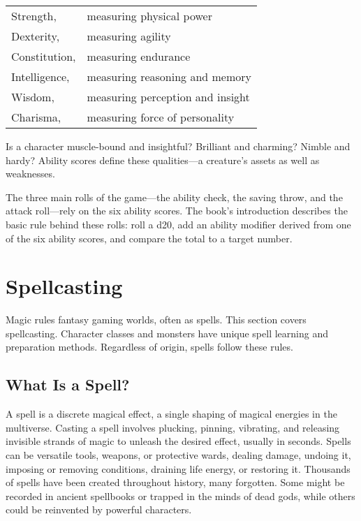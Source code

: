 \begin{longtable}[]{@{}
  >{\raggedright\arraybackslash}p{}
  >{\raggedright\arraybackslash}p{}@{}}
\toprule\noalign{}
\endhead
\bottomrule\noalign{}
\endlastfoot
Strength, & measuring physical power \\
Dexterity, & measuring agility \\
Constitution, & measuring endurance \\
Intelligence, & measuring reasoning and memory \\
Wisdom, & measuring perception and insight \\
Charisma, & measuring force of personality \\
\end{longtable}

Is a character muscle-bound and insightful? Brilliant and charming?
Nimble and hardy? Ability scores define these qualities---a creature's
assets as well as weaknesses.

The three main rolls of the game---the ability check, the saving throw,
and the attack roll---rely on the six ability scores. The book's
introduction describes the basic rule behind these rolls: roll a d20,
add an ability modifier derived from one of the six ability scores, and
compare the total to a target number.

\section{Spellcasting}\label{spellcasting}

Magic rules fantasy gaming worlds, often as spells. This section covers
spellcasting. Character classes and monsters have unique spell learning
and preparation methods. Regardless of origin, spells follow these
rules.

\subsection{What Is a Spell?}\label{_what_is_a_spell}

A spell is a discrete magical effect, a single shaping of magical
energies in the multiverse. Casting a spell involves plucking, pinning,
vibrating, and releasing invisible strands of magic to unleash the
desired effect, usually in seconds. Spells can be versatile tools,
weapons, or protective wards, dealing damage, undoing it, imposing or
removing conditions, draining life energy, or restoring it. Thousands of
spells have been created throughout history, many forgotten. Some might
be recorded in ancient spellbooks or trapped in the minds of dead gods,
while others could be reinvented by powerful characters.

